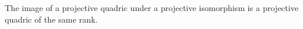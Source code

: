 The image of a projective quadric under a projective isomorphism is a projective quadric of the same rank.
